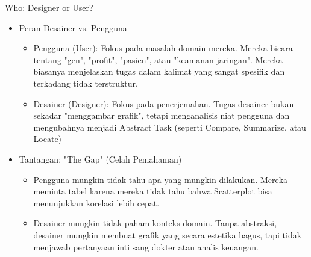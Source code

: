 \documentclass[t]{beamer}
\begin{document}
\begin{frame}{Who: Designer or User?}
\begin{itemize}
	\item Peran Desainer vs. Pengguna
	\begin{itemize}
		\item Pengguna (User): Fokus pada masalah domain mereka. Mereka bicara tentang "gen", "profit", "pasien", atau "keamanan jaringan". Mereka biasanya menjelaskan tugas dalam kalimat yang sangat spesifik dan terkadang tidak terstruktur.
		\item Desainer (Designer): Fokus pada penerjemahan. Tugas desainer bukan sekadar "menggambar grafik", tetapi menganalisis niat pengguna dan mengubahnya menjadi Abstract Task (seperti Compare, Summarize, atau Locate)
	\end{itemize}
	\item Tantangan: "The Gap" (Celah Pemahaman)
	\begin{itemize}
		\item Pengguna mungkin tidak tahu apa yang mungkin dilakukan. Mereka meminta tabel karena mereka tidak tahu bahwa Scatterplot bisa menunjukkan korelasi lebih cepat.
		\item Desainer mungkin tidak paham konteks domain. Tanpa abstraksi, desainer mungkin membuat grafik yang secara estetika bagus, tapi tidak menjawab pertanyaan inti sang dokter atau analis keuangan.
	\end{itemize}
\end{itemize}
\end{frame}

\end{document}
